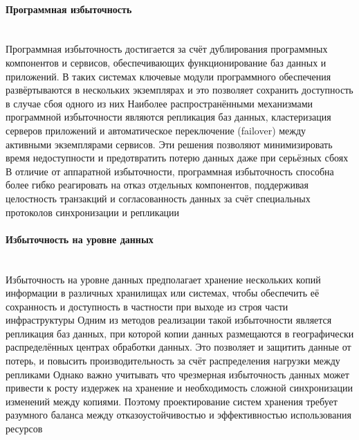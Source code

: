 \paragraph{Программная избыточность} ~\\
Программная избыточность достигается за счёт дублирования программных компонентов и сервисов, обеспечивающих функционирование баз данных и приложений. В таких системах ключевые модули программного обеспечения развёртываются в нескольких экземплярах и это позволяет сохранить доступность в случае сбоя одного из них \autocites{RajeshKumar}{SameerParadkar}
Наиболее распространёнными механизмами программной избыточности являются репликация баз данных, кластеризация серверов приложений и автоматическое переключение (failover) между активными экземплярами сервисов. Эти решения позволяют минимизировать время недоступности и предотвратить потерю данных даже при серьёзных сбоях \autocite{OszuValduriez}
В отличие от аппаратной избыточности, программная избыточность способна более гибко реагировать на отказ отдельных компонентов, поддерживая целостность транзакций и согласованность данных за счёт специальных протоколов синхронизации и репликации \autocite{Kleppmann}

\paragraph{Избыточность на уровне данных} ~\\
Избыточность на уровне данных предполагает хранение нескольких копий информации в различных хранилищах или системах, чтобы обеспечить её сохранность и доступность в частности при выходе из строя части инфраструктуры \autocite{RajeshKumar}
Одним из методов реализации такой избыточности является репликация баз данных, при которой копии данных размещаются в географически распределённых центрах обработки данных. Это позволяет и защитить данные от потерь, и повысить производительность за счёт распределения нагрузки между репликами \autocite{OszuValduriez}
Однако важно учитывать что чрезмерная избыточность данных может привести к росту издержек на хранение и необходимость сложной синхронизации изменений между копиями. Поэтому проектирование систем хранения требует разумного баланса между отказоустойчивостью и эффективностью использования ресурсов \autocite{Kleppmann}

